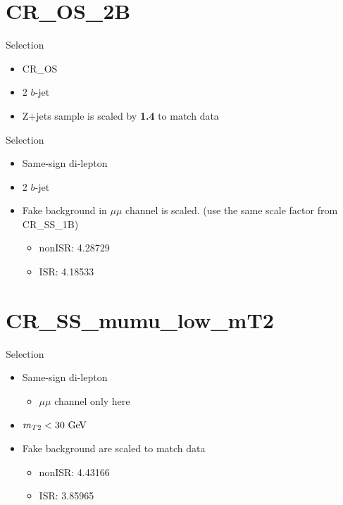 \documentclass[mathserif,serif]{beamer}
\begin{document}



\section{CR\_OS\_2B}
\begin{frame}
\sectionpage
\end{frame}

\begin{frame}{Selection}
\begin{itemize}
\item CR\_OS
\item 2 $b$-jet
\item Z+jets sample is scaled by {\bf 1.4} to match data
\end{itemize}
\end{frame}



\begin{frame}{Selection}
\begin{itemize}
\item Same-sign di-lepton
\item 2 $b$-jet
\item Fake background in $\mu\mu$ channel is scaled. (use the same scale factor from CR\_SS\_1B)
\begin{itemize}
\item nonISR: 4.28729
\item ISR: 4.18533
\end{itemize}
\end{itemize}
\end{frame}




\section{CR\_SS\_mumu\_low\_mT2}
\begin{frame}
\sectionpage
\end{frame}

\begin{frame}{Selection}
\begin{itemize}
\item Same-sign di-lepton
\begin{itemize}
\item $\mu\mu$ channel only here
\end{itemize}
\item $m_{T2}<30\GeV$
\item Fake background are scaled to match data
\begin{itemize}
\item nonISR: 4.43166
\item ISR: 3.85965
\end{itemize}
\end{itemize}
\end{frame}
\end{document}
